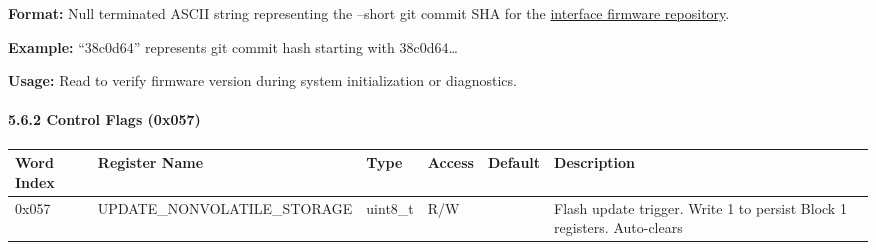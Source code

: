 \documentclass[
  11pt,
]{article}
\newcounter{none} %
\begin{document}
\textbf{Format:} Null terminated ASCII string representing the --short
git commit SHA for the
\href{https://github.com/psyonicinc/fdcan-abh-converter-firmware}{interface
firmware repository}.

\textbf{Example:} ``38c0d64'' represents git commit hash starting with
38c0d64\ldots{}

\textbf{Usage:} Read to verify firmware version during system
initialization or diagnostics.

\paragraph{5.6.2 Control Flags (0x057)}\label{control-flags-0x057}

{\def\LTcaptype{none} %
\begin{longtable}[]{@{}
  >{\raggedright\arraybackslash}p{}
  >{\raggedright\arraybackslash}p{}
  >{\raggedright\arraybackslash}p{}
  >{\raggedright\arraybackslash}p{}
  >{\raggedright\arraybackslash}p{}
  >{\raggedright\arraybackslash}p{}@{}}
\toprule\noalign{}
\begin{minipage}[b]{\linewidth}\raggedright
Word Index
\end{minipage} & \begin{minipage}[b]{\linewidth}\raggedright
Register Name
\end{minipage} & \begin{minipage}[b]{\linewidth}\raggedright
Type
\end{minipage} & \begin{minipage}[b]{\linewidth}\raggedright
Access
\end{minipage} & \begin{minipage}[b]{\linewidth}\raggedright
Default
\end{minipage} & \begin{minipage}[b]{\linewidth}\raggedright
Description
\end{minipage} \\
\midrule\noalign{}
\endhead
\bottomrule\noalign{}
\endlastfoot
0x057 & UPDATE\_NONVOLATILE\_STORAGE & uint8\_t & R/W & 0 & Flash update
trigger. Write 1 to persist Block 1 registers. Auto-clears \\
\end{longtable}
}
\end{document}
